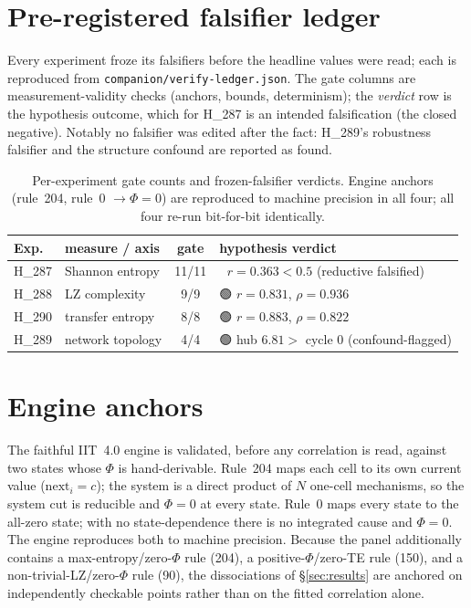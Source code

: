 \documentclass[11pt,a4paper]{article}
\providecommand{\tierGreen}{🟢}
\providecommand{\tierRed}{🔴}
\newcommand{\bigphi}{\ensuremath{\Phi}}
\begin{document}
\appendix

\section{Pre-registered falsifier ledger}
\label{app:falsifiers}

Every experiment froze its falsifiers before the headline values were
read; each is reproduced from \texttt{companion/verify-ledger.json}. The
gate columns are measurement-validity checks (anchors, bounds,
determinism); the \emph{verdict} row is the hypothesis outcome, which for
H\_287 is an intended falsification (the closed negative). Notably no
falsifier was edited after the fact: H\_289's robustness falsifier and the
structure confound are reported as found.

\begin{table}[h]
\centering
\small
\begin{tabular}{llcl}
\toprule
\textbf{Exp.} & \textbf{measure / axis} & \textbf{gate} & \textbf{hypothesis verdict} \\
\midrule
H\_287 & Shannon entropy   & 11/11 & \tierRed{} \(r=0.363<0.5\) (reductive falsified) \\
H\_288 & LZ complexity     & 9/9   & \tierGreen{} \(r=0.831\), \(\rho=0.936\) \\
H\_290 & transfer entropy  & 8/8   & \tierGreen{} \(r=0.883\), \(\rho=0.822\) \\
H\_289 & network topology  & 4/4   & \tierGreen{} hub \(6.81>\) cycle \(0\) (confound-flagged) \\
\bottomrule
\end{tabular}
\caption{Per-experiment gate counts and frozen-falsifier verdicts. Engine
anchors (rule~204, rule~0 \(\to\bigphi{=}0\)) are reproduced to machine
precision in all four; all four re-run bit-for-bit identically.}
\label{tab:falsifiers}
\end{table}

\section{Engine anchors}
\label{app:anchors}

The faithful IIT~4.0 engine is validated, before any correlation is read,
against two states whose \bigphi{} is hand-derivable. Rule~204 maps each
cell to its own current value (\(\mathrm{next}_i=c\)); the system is a
direct product of \(N\) one-cell mechanisms, so the system cut is
reducible and \(\bigphi=0\) at every state. Rule~0 maps every state to the
all-zero state; with no state-dependence there is no integrated cause and
\(\bigphi=0\). The engine reproduces both to machine precision. Because
the panel additionally contains a max-entropy/zero-\bigphi{} rule (204),
a positive-\bigphi{}/zero-TE rule (150), and a non-trivial-LZ/zero-\bigphi{}
rule (90), the dissociations of \S\ref{sec:results} are anchored on
independently checkable points rather than on the fitted correlation
alone.



\end{document}
